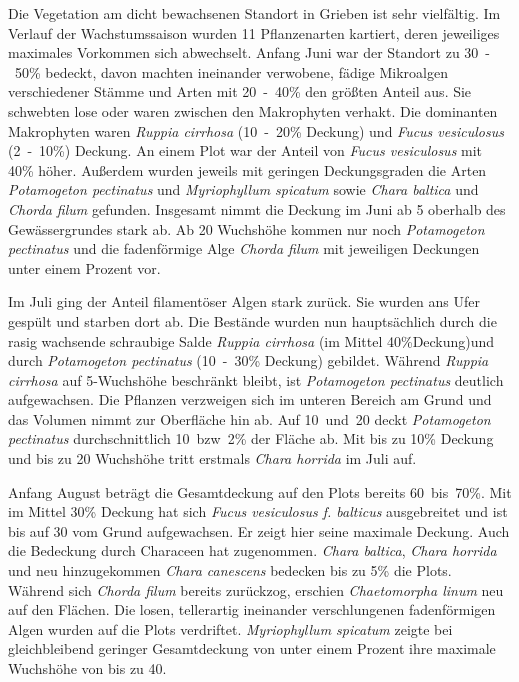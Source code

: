 Die Vegetation am dicht bewachsenen Standort in Grieben ist sehr vielfältig. Im Verlauf der Wachstumssaison wurden 11 Pflanzenarten kartiert, deren jeweiliges maximales Vorkommen sich abwechselt. Anfang Juni war der Standort zu \unit{30-50}{\%} bedeckt, davon machten ineinander verwobene, fädige Mikroalgen verschiedener Stämme und Arten mit \unit{20-40}{\%} den größten Anteil aus. Sie schwebten lose oder waren zwischen den Makrophyten verhakt. Die dominanten Makrophyten waren \textit{Ruppia cirrhosa} (\unit{10-20}{\%} Deckung) und \textit{Fucus vesiculosus} (\unit{2-10}{\%}) Deckung. An einem Plot war der Anteil von \textit{Fucus vesiculosus} mit \unit{40}{\%} höher. Außerdem wurden jeweils mit geringen Deckungsgraden die Arten \textit{Potamogeton pectinatus} und \textit{Myriophyllum spicatum} sowie \textit{Chara baltica} und \textit{Chorda filum} gefunden. Insgesamt nimmt die Deckung im Juni ab \unit{5}{\centi\metre} oberhalb des Gewässergrundes stark ab. Ab \unit{20}{\centi\metre} Wuchshöhe kommen nur noch \textit{Potamogeton pectinatus} und die fadenförmige Alge \textit{Chorda filum} mit jeweiligen Deckungen unter einem Prozent vor.

Im Juli ging der Anteil filamentöser Algen stark zurück. Sie wurden ans Ufer gespült und starben dort ab. Die Bestände wurden nun hauptsächlich durch die rasig wachsende schraubige Salde \textit{Ruppia cirrhosa} (im Mittel \unit{40}{\%}Deckung)und durch \textit{Potamogeton pectinatus} (\unit{10-30}{\%} Deckung) gebildet. Während \textit{Ruppia cirrhosa} auf \unit{5}{\centi\metre}-Wuchshöhe beschränkt bleibt, ist \textit{Potamogeton pectinatus} deutlich aufgewachsen. Die Pflanzen verzweigen sich im unteren Bereich am Grund und das Volumen nimmt zur Oberfläche hin ab. Auf \unit{10 und 20} {\centi\metre} deckt \textit{Potamogeton pectinatus} durchschnittlich \unit{10 bzw. 2}{\%} der Fläche ab. Mit bis zu \unit{10}{\%} Deckung und bis zu \unit{20}{\centi\metre} Wuchshöhe tritt erstmals \textit{Chara horrida} im Juli auf.

Anfang August beträgt die Gesamtdeckung auf den Plots bereits \unit{60 bis 70}{\%}. Mit im Mittel \unit{30}{\%} Deckung hat sich \textit{Fucus vesiculosus f. balticus} ausgebreitet und ist bis auf \unit{30}{\centi\metre} vom Grund aufgewachsen. Er zeigt hier seine maximale Deckung. Auch die Bedeckung durch Characeen hat zugenommen. \textit{Chara baltica}, \textit{Chara horrida} und neu hinzugekommen \textit{Chara canescens} bedecken bis zu \unit{5}{\%} die Plots. Während sich \textit{Chorda filum} bereits zurückzog, erschien \textit{Chaetomorpha linum} neu auf den Flächen. Die losen, tellerartig ineinander verschlungenen fadenförmigen Algen wurden auf die Plots verdriftet. \textit{Myriophyllum spicatum} zeigte bei gleichbleibend geringer Gesamtdeckung von unter einem Prozent ihre maximale Wuchshöhe von bis zu \unit{40}{\centi\metre}.

